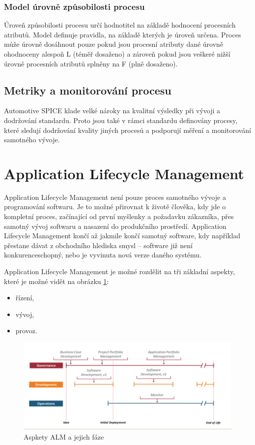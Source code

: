 \documentclass[czech,master,public,dept460,male,cpdeclaration,oneside]{diploma}
\begin{document}
\subsubsection{Model úrovně způsobilosti procesu}
Úroveň způsobilosti procesu určí hodnotitel na základě hodnocení procesních atributů. Model definuje  pravidla, na základě kterých je úroveň určena. Proces může úrovně dosáhnout pouze pokud jsou procesní atributy dané úrovně ohodnoceny alespoň L (téměř dosaženo) a zároveň pokud jsou veškeré nižší úrovně procesních atributů splněny na F (plně dosaženo).


\subsection{Metriky a monitorování procesu}
Automotive SPICE klade velké nároky na kvalitní výsledky při vývoji a dodržování standardu. Proto jsou také v rámci standardu definovány procesy, které sledují dodržování kvality jiných procesů a podporují měření a monitorování samotného vývoje.



\section{Application Lifecycle Management}

Application Lifecycle Management není pouze proces samotného vývoje a programování softwaru. Je to možné přirovnat k životě člověka, kdy jde o kompletní proces, začínající od první myšlenky a požadavku zákazníka, přes samotný vývoj softwaru a nasazení do produkčního prostředí. Application Lifecycle Management končí až jakmile končí samotný software, kdy například přestane dávat z obchodního hlediska smysl -- software již není konkurenceschopný, nebo je vyvinuta nová verze daného systému. \cite{alm_chappell}

Application Lifecycle Management je možné rozdělit na tři základní aspekty, které je možné vidět na obrázku \ref{fig:alm}:

\begin{itemize}
  \item řízení,
  \item vývoj,
  \item provoz.
\end{itemize}

\begin{figure}[!ht]
    \centering
    \includegraphics[width=1\textwidth]{Diplomka/Figures/alm.png}
    \caption{Aspkety ALM a jejich fáze \cite{alm_chappell}}
    \label{fig:alm}
\end{figure}
\end{document}
